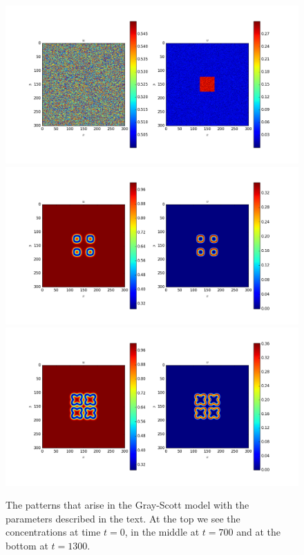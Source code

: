 \documentclass[a4paper]{article}
\begin{document}
\begin{figure}
\includegraphics[width=12cm]{gs_0}
\includegraphics[width=12cm]{gs_700}
\includegraphics[width=12cm]{gs_1300}
\caption{The patterns that arise in the Gray-Scott model with the parameters described in the text. At the top we see the concentrations at time $t=0$, in the middle at $t=700$ and at the bottom at $t=1300$.}
\label{fig:gs_time1}
\end{figure}
\end{document}
